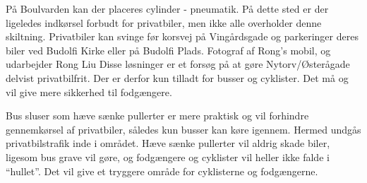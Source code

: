 På Boulvarden kan der placeres cylinder - pneumatik. På dette sted er der ligeledes indkørsel forbudt for privatbiler, men ikke alle overholder denne skiltning. Privatbiler kan svinge før korsvej på Vingårdsgade og parkeringer deres biler ved Budolfi Kirke eller på Budolfi Plads. 
                                                Fotograf af Rong’s mobil, og udarbejder Rong Liu
Disse løsninger er et forsøg på at gøre Nytorv/Østerågade delvist privatbilfrit. Der er derfor kun tilladt for busser og cyklister. Det må og vil give mere sikkerhed til fodgængere.

Bus sluser som hæve sænke pullerter er mere praktisk og vil forhindre gennemkørsel af privatbiler, således kun busser kan køre igennem. Hermed undgås privatbilstrafik inde i området. Hæve sænke pullerter vil aldrig skade biler, ligesom bus grave vil gøre, og fodgængere og cyklister vil heller ikke falde i “hullet”. Det vil give et tryggere område for cyklisterne og fodgængerne. 
